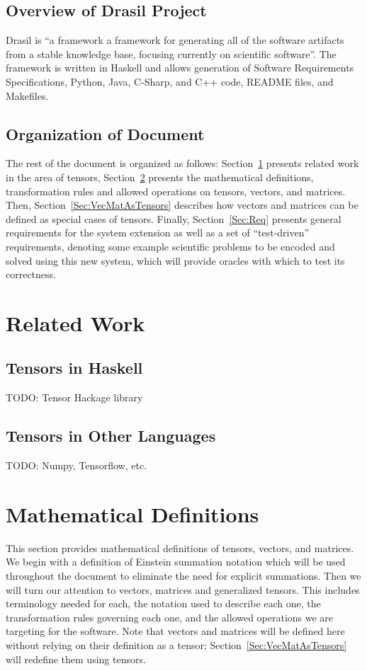 \documentclass[12pt]{article}
\begin{document}
\subsection{Overview of Drasil Project}
Drasil is ``a framework a framework for generating all of the software artifacts from 
a stable knowledge base, focusing currently on scientific software''. The framework
is written in Haskell and allows generation of Software Requirements Specifications,
Python, Java, C-Sharp, and C++ code, README files, and Makefiles.

\subsection{Organization of Document}
The rest of the document is organized as follows: Section~\ref{Sec:RelatedWork} 
presents related work in the area of tensors, Section~\ref{Sec:MathematicalDefinitions}
presents the mathematical definitions, transformation rules and allowed operations
on tensors, vectors, and matrices. Then, Section~\ref{Sec:VecMatAsTensors} describes
how vectors and matrices can be defined as special cases of tensors. Finally, 
Section~\ref{Sec:Req} presents general requirements for the system extension as well as
a set of ``test-driven'' requirements, denoting some example scientific problems
to be encoded and solved using this new system, which will provide oracles with which
to test its correctness.


\section{Related Work}\label{Sec:RelatedWork}

\subsection{Tensors in Haskell}
TODO: Tensor Hackage library

\subsection{Tensors in Other Languages}
TODO: Numpy, Tensorflow, etc.

\section{Mathematical Definitions}\label{Sec:MathematicalDefinitions}
This section provides mathematical definitions of tensors, vectors, and matrices. We
begin with a definition of Einstein summation notation which will be used throughout
the document to eliminate the need for explicit summations. Then we will turn our
attention to vectors, matrices and generalized tensors.
This includes terminology needed for each, the notation used to describe each one,
the transformation rules governing each one, and the allowed operations we are 
targeting for the software. Note that vectors and matrices will be defined here without
relying on their definition as a tensor; Section~\ref{Sec:VecMatAsTensors} will redefine
them using tensors.
\end{document}
